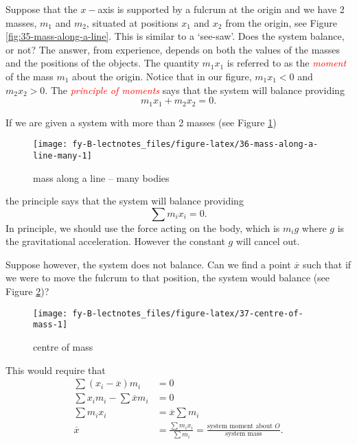 \documentclass[
  11pt,
  oneside]{book}
\newcommand{\slide}{}
\theoremstyle{definition}
\theoremstyle{definition}
\theoremstyle{definition}
\theoremstyle{definition}
\theoremstyle{remark}
\begin{document}
Suppose that the \(x-\)axis is supported by a fulcrum at the origin and we have 2 masses, \(m_1\) and \(m_2\), situated at positions \(x_1\) and \(x_2\) from the origin, see Figure \ref{fig:35-mass-along-a-line}. This is similar to a `see-saw'. Does the system balance, or not? The answer, from experience, depends on both the values of the masses and the positions of the objects. The quantity \(m_1x_1\) is referred to as the \textcolor{red}{\em moment} of the mass \(m_1\) about the origin. Notice that in our figure, \(m_1x_1<0\) and \(m_2x_2>0\). The \textcolor{red}{\em principle of moments} says that the system will balance providing
\[
m_1x_1 + m_2x_2 = 0.
\]

\slide

If we are given a system with more than 2 masses (see Figure \ref{fig:36-mass-along-a-line-many})

\begin{figure}

{\centering \texttt{[image: fy-B-lectnotes\_files/figure-latex/36-mass-along-a-line-many-1]} 

}

\caption{mass along a line -- many bodies}\label{fig:36-mass-along-a-line-many}
\end{figure}

the principle says that the system will balance providing
\[
\sum m_ix_i = 0.
\]
In principle, we should use the force acting on the body, which is \(m_ig\) where \(g\) is the gravitational acceleration. However the constant \(g\) will cancel out.
\slide
Suppose however, the system does not balance. Can we find a point \(\overline x\) such that if we were to move the fulcrum to that position, the system would balance (see Figure \ref{fig:37-centre-of-mass})?

\begin{figure}

{\centering \texttt{[image: fy-B-lectnotes\_files/figure-latex/37-centre-of-mass-1]} 

}

\caption{centre of mass}\label{fig:37-centre-of-mass}
\end{figure}

This would require that
\begin{align*}
\sum(x_i-\overline x)m_i& = 0\\
\sum x_i m_i-\sum{\overline x}m_i& = 0\\
\sum m_ix_i&=\overline x\sum m_i\\
\overline x&=\frac{\sum m_ix_i}{\sum m_i}=\frac{\text{system moment about $O$}}{\text{system mass}}.
\end{align*}
\end{document}
